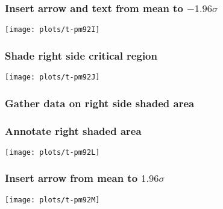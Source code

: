 \documentclass[11pt,english]{beamer}
\begin{document}
\begin{frame}
  \frametitle{Insert arrow and text from mean to $-1.96 \sigma$}


\end{frame}


\begin{frame}[plain]

\texttt{[image: plots/t-pm92I]}
\end{frame}

\begin{frame}
  \frametitle{Shade right side critical region}



\end{frame}

\begin{frame}[plain]

\texttt{[image: plots/t-pm92J]}
\end{frame}

\begin{frame}
  \frametitle{Gather data on right side shaded area}


\end{frame}



\begin{frame}
  \frametitle{Annotate right shaded area}


\end{frame}

\begin{frame}[plain]

\texttt{[image: plots/t-pm92L]}
\end{frame}

\begin{frame}
  \frametitle{Insert arrow from mean to $1.96 \sigma$}


\end{frame}

\begin{frame}[plain]


\texttt{[image: plots/t-pm92M]}

\end{frame}

\end{document}
